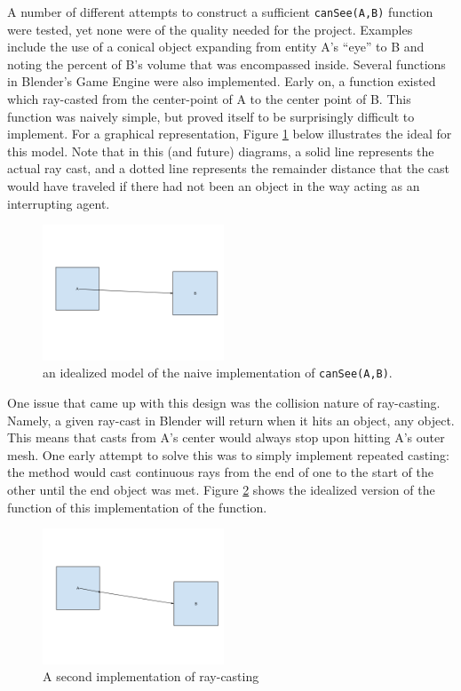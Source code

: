 A number of different attempts to construct a sufficient \texttt{canSee(A,B)} function were tested, yet none were of the quality needed for the project. Examples include the use of a conical object expanding from entity A's ``eye'' to B and noting the percent of B's volume that was encompassed inside. Several functions in Blender's Game Engine were also implemented. Early on, a function existed which ray-casted from the center-point of A to the center point of B. This function was naively simple, but proved itself to be surprisingly difficult to implement. For a graphical representation, Figure \ref{fig:vision1} below illustrates the ideal for this model. Note that in this (and future) diagrams, a solid line represents the actual ray cast, and a dotted line represents the remainder distance that the cast would have traveled if there had not been an object in the way acting as an interrupting agent.	
	
\begin{figure}[h]
	\begin{center}
		\includegraphics[width=0.48\textwidth]{figures/vision1.png}
	\end{center}
	\caption{an idealized model of the naive implementation of \texttt{canSee(A,B)}.}
	\label{fig:vision1}
\end{figure}

One issue that came up with this design was the collision nature of ray-casting. Namely, a given ray-cast in Blender will return when it hits an object, any object. This means that casts from A's center would always stop upon hitting A's outer mesh. One early attempt to solve this was to simply implement repeated casting: the method would cast continuous rays from the end of one to the start of the other until the end object was met. Figure \ref{fig:vision2} shows the idealized version of the function of this implementation of the function.

\begin{figure}[h]
	\begin{center}
		\includegraphics[width=0.48\textwidth]{figures/vision2.png}
	\end{center}
	\caption{A second implementation of ray-casting}
	\label{fig:vision2}
\end{figure}

